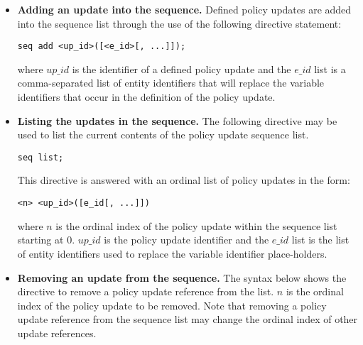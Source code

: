 \documentclass[11pt]{llncs}
\begin{document}
        \begin{itemize}
          \item
            {\bf Adding an update into the sequence.} Defined policy updates
            are added into the sequence list through the use of the following
            directive statement:

            \begin{verbatim}seq add <up_id>([<e_id>[, ...]]);\end{verbatim}

            \noindent where $up\_id$ is the identifier of a defined policy
            update and the $e\_id$ list is a comma-separated list of entity
            identifiers that will replace the variable identifiers that occur
            in the definition of the policy update.

          \vspace{1mm}
          \item
            {\bf Listing the updates in the sequence.} The following
            directive may be used to list the current contents of the policy
            update sequence list.

            \begin{verbatim}seq list;\end{verbatim}

            This directive is answered with an ordinal list of policy
            updates in the form:

            \begin{verbatim}<n> <up_id>([e_id[, ...]])\end{verbatim}

            \noindent where $n$ is the ordinal index of the policy update
            within the sequence list starting at 0. $up\_id$ is the policy
            update identifier and the $e\_id$ list is the list of entity
            identifiers used to replace the variable identifier
            place-holders.

          \vspace{1mm}
          \item
            {\bf Removing an update from the sequence.} The syntax below
            shows the directive to remove a policy update reference from the
            list. $n$ is the ordinal index of the policy update to be
            removed. Note that removing a policy update reference from the
            sequence list may change the ordinal index of other update
            references.


\end{itemize}
\end{document}
